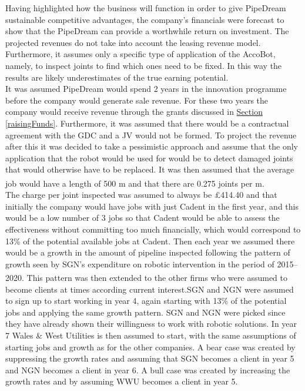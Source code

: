 \documentclass[11pt]{article}		%
\newcommand{\supercite}[1]{\textsuperscript{\cite{#1}}}		%
\newcommand{\sectref}[1]{\hyperref[#1]{Section \ref*{#1}}}     %
\begin{document}
		        	        
	 Having highlighted how the business will function in order to give PipeDream sustainable competitive advantages, the company’s financials were forecast to show that the PipeDream can provide a worthwhile return on investment.
The projected revenues do not take into account the leasing revenue model. Furthermore, it assumes only a specific type of application of the AccoBot, namely, to inspect joints to find which ones need to be fixed. In this way the results are likely underestimates of the true earning potential.
\\ \hspace*{3ex}
It was assumed PipeDream would spend 2 years in the innovation programme before the company would generate sale revenue. For these two years the company would receive revenue through the grants discussed in \sectref{raisingFunds}. Furthermore, it was assumed that there would be a contractual agreement with the GDC and a JV would not be formed. To project the revenue after this it was decided to take a pessimistic approach and assume that the only application that the robot would be used for would be to detect damaged joints that would otherwise have to be replaced. It was then assumed that the average job would have a length of 500 m and that there are 0.275 joints per m.\supercite{SGN_Southern}
\\
The charge per joint inspected was assumed to always be £414.40 and that initially the company would have jobs with just Cadent in the first year, and this would be a low number of 3 jobs so that  Cadent would be able to assess the effectiveness without committing too much financially, which would correspond to 13\% of the potential available jobs at Cadent. Then each year we assumed there would be a growth in the amount of pipeline inspected following the pattern of growth seen by SGN’s expenditure on robotic intervention in the period of 2015--2020.\supercite{SGN_Southern} This pattern was then extended to the other firms who were assumed to become clients at times according current interest.SGN and NGN were assumed to sign up to start working in year 4, again starting with 13\% of the potential jobs and applying the same growth pattern. SGN and NGN were picked since they have already shown their willingness to work with robotic solutions. In year 7 Wales \& West Utilities is then assumed to start, with the same assumptions of starting jobs and growth as for the other companies. A bear case was created by suppressing the growth rates and assuming that SGN becomes a client in year 5 and NGN becomes a client in year 6. A bull case was created by increasing the growth rates and by assuming WWU becomes a client in year 5.
\end{document}
